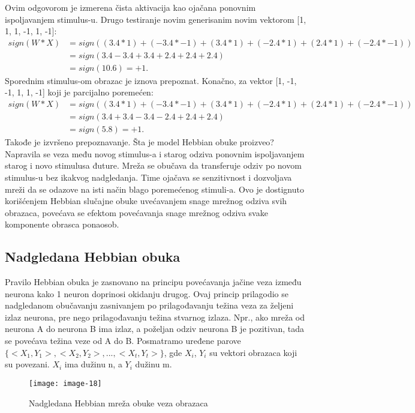 \documentclass[fontsize=11bp, paper=a4]{scrarticle}
\begin{document}
Ovim odgovorom je izmerena čista aktivacija kao ojačana ponovnim ispoljavanjem stimulus-u.
Drugo testiranje novim generisanim novim vektorom [1, 1, 1, -1, 1, -1]:
$$
\begin{aligned}
    sign(W*X) &= sign((3.4*1) + (-3.4*-1) + (3.4*1) + (-2.4*1) + (2.4*1) + (-2.4*-1)) \\
    &= sign(3.4 - 3.4 + 3.4 + 2.4 + 2.4 + 2.4) \\
    &= sign(10.6) = +1.
\end{aligned}
$$
Sporednim stimulus-om obrazac je iznova prepoznat.
Konačno, za vektor [1, -1, -1, 1, 1, -1] koji je parcijalno poremećen:
$$
\begin{aligned}
    sign(W*X) &= sign((3.4*1) + (-3.4*-1) + (3.4*1) + (-2.4*1) + (2.4*1) + (-2.4*-1))\\ 
     &= sign(3.4 + 3.4 - 3.4 - 2.4 + 2.4 + 2.4)\\
     &= sign(5.8) = +1.
\end{aligned}
$$
Takođe je izvršeno prepoznavanje.
Šta je model Hebbian obuke proizveo? Napravila se veza među novog stimulus-a i starog odziva ponovnim ispoljavanjem starog i novo stimulusa đuture. Mreža se obučava da transferuje odziv po novom stimulus-u bez ikakvog nadgledanja. Time ojačava se senzitivnost i dozvoljava mreži da se odazove na isti način blago poremećenog stimuli-a. Ovo je dostignuto korišćenjem Hebbian slučajne obuke uvećavanjem snage mrežnog odziva svih obrazaca, povećava se efektom povećavanja snage mrežnog odziva svake komponente obrasca ponaosob.


\subsection{Nadgledana Hebbian obuka}

Pravilo Hebbian obuka je zasnovano na principu povećavanja jačine veza između neurona kako 1 neuron doprinosi okidanju drugog. Ovaj princip prilagodio se nadgledanom obučavanju zasnivanjem po prilagođavanju težina veza za željeni izlaz neurona, pre nego prilagođavanju težina stvarnog izlaza. Npr., ako mreža od neurona A do neurona B ima izlaz, a poželjan odziv neurona B je pozitivan, tada se povećava težina veze od A do B. Posmatramo uređene parove $\{<X_1, Y_1>, <X_2, Y_2>, ..., <X_t, Y_t>\}$, gde $X_i$, $Y_i$ su vektori obrazaca koji su povezani. $X_i$ ima dužinu n, a $Y_i$ dužinu m. 

\begin{figure}[h!]
    \centering
    \texttt{[image: image-18]}
    \caption{Nadgledana Hebbian mreža obuke veza obrazaca}
\end{figure}
\end{document}
